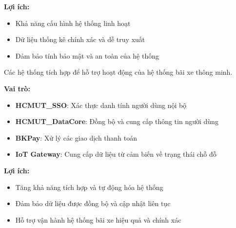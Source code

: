 \textbf{Lợi ích:}
\begin{itemize}
    \item Khả năng cấu hình hệ thống linh hoạt
    \item Dữ liệu thống kê chính xác và dễ truy xuất
    \item Đảm bảo tính bảo mật và an toàn của hệ thống
\end{itemize}


Các hệ thống tích hợp để hỗ trợ hoạt động của hệ thống bãi xe thông minh.

\textbf{Vai trò:}
\begin{itemize}
    \item \textbf{HCMUT\_SSO}: Xác thực danh tính người dùng nội bộ
    \item \textbf{HCMUT\_DataCore}: Đồng bộ và cung cấp thông tin người dùng
    \item \textbf{BKPay}: Xử lý các giao dịch thanh toán
    \item \textbf{IoT Gateway}: Cung cấp dữ liệu từ cảm biến về trạng thái chỗ đỗ
\end{itemize}

\textbf{Lợi ích:}
\begin{itemize}
    \item Tăng khả năng tích hợp và tự động hóa hệ thống
    \item Đảm bảo dữ liệu được đồng bộ và cập nhật liên tục
    \item Hỗ trợ vận hành hệ thống bãi xe hiệu quả và chính xác
\end{itemize}
